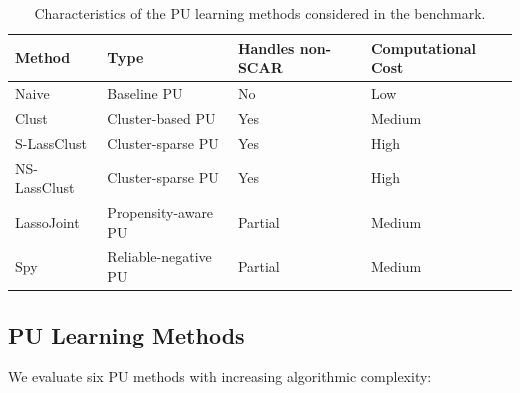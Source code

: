 \documentclass[applsci,article,submit,pdftex,moreauthors]{Definitions/mdpi}
\begin{document}
\begin{table}[H]
\caption{Characteristics of the PU learning methods considered in the benchmark.}
\label{tab:method_summary}
\centering
\begin{tabular}{llll}
\toprule
\textbf{Method} & \textbf{Type} & \textbf{Handles non-SCAR} & \textbf{Computational Cost} \\
\midrule
Naive           & Baseline PU              & No      & Low    \\
Clust           & Cluster-based PU         & Yes     & Medium \\
S-LassClust     & Cluster-sparse PU        & Yes     & High   \\
NS-LassClust    & Cluster-sparse PU        & Yes     & High   \\
LassoJoint      & Propensity-aware PU      & Partial & Medium \\
Spy             & Reliable-negative PU     & Partial & Medium \\
\bottomrule
\end{tabular}
\end{table}

\subsection{PU Learning Methods}

We evaluate six PU methods with increasing algorithmic complexity:
\end{document}
